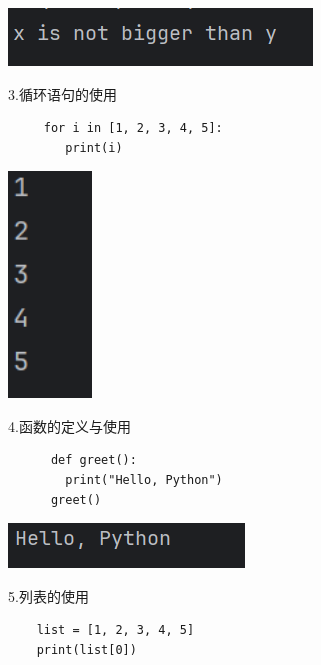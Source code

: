 \documentclass{article}
\begin{document}
\noindent
\begin{minipage}{\linewidth}
  \centering
  \includegraphics[width=0.5\linewidth]{if.png}
  \label{fig:example}
\end{minipage}

3.循环语句的使用
 \begin{verbatim}
     for i in [1, 2, 3, 4, 5]:
        print(i)
 \end{verbatim}

\noindent
\begin{minipage}{\linewidth}
  \centering
  \includegraphics[width=0.5\linewidth,height=6cm]{for.png}
  \label{fig:example}
\end{minipage}

4.函数的定义与使用
\begin{verbatim}
      def greet():
        print("Hello, Python") 
      greet()
\end{verbatim}

\noindent
\begin{minipage}{\linewidth}
 \centering
  \includegraphics[width=0.5\linewidth]{def.png}
  \label{fig:example}
\end{minipage}



5.列表的使用
\begin{verbatim}
    list = [1, 2, 3, 4, 5]
    print(list[0])
\end{verbatim}
\end{document}
